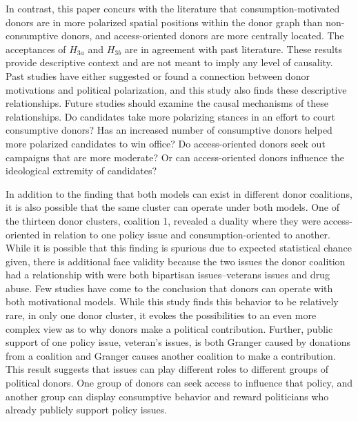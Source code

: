 \documentclass[12pt,]{article}
\begin{document}
In contrast, this paper concurs with the literature that
consumption-motivated donors are in more polarized spatial positions
within the donor graph than non-consumptive donors, and access-oriented
donors are more centrally located. The acceptances of \(H_{3a}\) and
\(H_{3b}\) are in agreement with past literature. These results provide
descriptive context and are not meant to imply any level of causality.
Past studies have either suggested or found a connection between donor
motivations and political polarization, and this study also finds these
descriptive relationships. Future studies should examine the causal
mechanisms of these relationships. Do candidates take more polarizing
stances in an effort to court consumptive donors? Has an increased
number of consumptive donors helped more polarized candidates to win
office? Do access-oriented donors seek out campaigns that are more
moderate? Or can access-oriented donors influence the ideological
extremity of candidates?

In addition to the finding that both models can exist in different donor
coalitions, it is also possible that the same cluster can operate under
both models. One of the thirteen donor clusters, coalition 1, revealed a
duality where they were access-oriented in relation to one policy issue
and consumption-oriented to another. While it is possible that this
finding is spurious due to expected statistical chance given, there is
additional face validity because the two issues the donor coalition had
a relationship with were both bipartisan issues--veterans issues and
drug abuse. Few studies have come to the conclusion that donors can
operate with both motivational models. While this study finds this
behavior to be relatively rare, in only one donor cluster, it evokes the
possibilities to an even more complex view as to why donors make a
political contribution. Further, public support of one policy issue,
veteran's issues, is both Granger caused by donations from a coalition
and Granger causes another coalition to make a contribution. This result
suggests that issues can play different roles to different groups of
political donors. One group of donors can seek access to influence that
policy, and another group can display consumptive behavior and reward
politicians who already publicly support policy issues.
\end{document}
